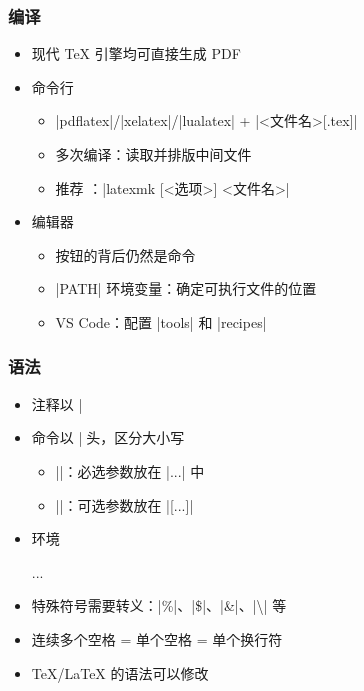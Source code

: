 \begin{frame}[fragile]
\frametitle{编译}
\begin{itemize}
  \item 现代 \TeX{} 引擎均可直接生成 PDF \pause
  \item 命令行

    \begin{itemize}
      \item |pdflatex|/|xelatex|/|lualatex| + |<文件名>[.tex]|
      \item 多次编译：读取并排版中间文件 \pause
      \item 推荐 ：|latexmk [<选项>] <文件名>|
    \end{itemize} \pause

  \item 编辑器

    \begin{itemize}
      \item 按钮的背后仍然是命令
      \item |PATH| 环境变量：确定可执行文件的位置
      \item VS Code：配置 |tools| 和 |recipes|
    \end{itemize}
\end{itemize}
\end{frame}

\begin{frame}[fragile]
\frametitle{语法}
\begin{itemize}
  \item 注释以 |%
  \item 命令以 |\| 开头，区分大小写

    \begin{itemize}
      \item ||：必选参数放在 |{...}| 中
      \item ||：可选参数放在 |[...]|
    \end{itemize}

  \item 环境

    \begin{texcode}[gobble=4, basicstyle=\footnotesize\ttfamily, emph={[1]env}]
      \begin{env}
        ...
      \end{env}
    \end{texcode}

  \item 特殊符号需要转义：|\%|、|\$|、|\&|、|\textbackslash| 等
  \item 连续多个空格 = 单个空格 = 单个换行符 \pause
  \item \TeX{}/\LaTeX{} 的语法可以修改
\end{itemize}
\end{frame}

